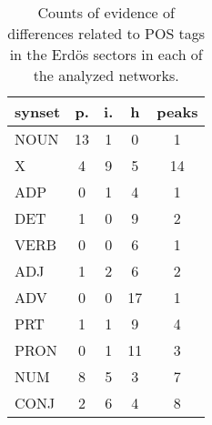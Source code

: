 \begin{table}[h!]
\begin{center}
\begin{tabular}{| l | c | c | c | c |}\hline
synset & p. & i. & h & peaks \\\hline
NOUN & 13  & 1  & 0  & 1 \\\hline
X & 4  & 9  & 5  & 14 \\\hline
ADP & 0  & 1  & 4  & 1 \\\hline
DET & 1  & 0  & 9  & 2 \\\hline
VERB & 0  & 0  & 6  & 1 \\\hline
ADJ & 1  & 2  & 6  & 2 \\\hline
ADV & 0  & 0  & 17  & 1 \\\hline
PRT & 1  & 1  & 9  & 4 \\\hline
PRON & 0  & 1  & 11  & 3 \\\hline
NUM & 8  & 5  & 3  & 7 \\\hline
CONJ & 2  & 6  & 4  & 8 \\\hline
\end{tabular}
\caption{Counts of evidence of differences related to POS tags in the Erd\"os sectors in each of the analyzed networks.}
\end{center}
\end{table}